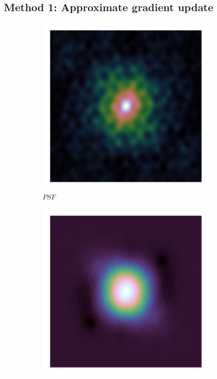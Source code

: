 \subsection{Method 1: Approximate gradient update}
\begin{figure}[h]
	\centering
	\begin{subfigure}[b]{0.245\linewidth}
		\includegraphics[width=\linewidth, clip, trim= 0.25in 0.25in 0.25in 0.25in]{./chapters/03.cd/simulated/psf.png}
		\caption{$PSF$}
	\end{subfigure}
	\begin{subfigure}[b]{0.245\linewidth}
		\includegraphics[width=\linewidth, clip, trim= 0.25in 0.25in 0.25in 0.25in]{./chapters/03.cd/simulated/psfSquared.png}

\end{subfigure}
\end{figure}
